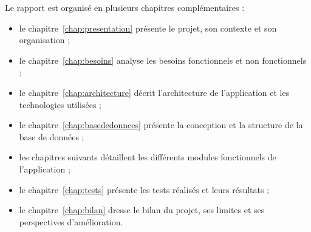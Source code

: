 Le rapport est organisé en plusieurs chapitres complémentaires :

\begin{itemize}[leftmargin=*]
    \item le chapitre~\ref{chap:presentation} présente le projet, son contexte et son organisation ;
    \item le chapitre~\ref{chap:besoins} analyse les besoins fonctionnels et non fonctionnels ;
    \item le chapitre~\ref{chap:architecture} décrit l'architecture de l'application et les technologies utilisées ;
    \item le chapitre~\ref{chap:basededonnees} présente la conception et la structure de la base de données ;
    \item les chapitres suivants détaillent les différents modules fonctionnels de l'application ;
    \item le chapitre~\ref{chap:tests} présente les tests réalisés et leurs résultats ;
    \item le chapitre~\ref{chap:bilan} dresse le bilan du projet, ses limites et ses perspectives d'amélioration.
\end{itemize}
